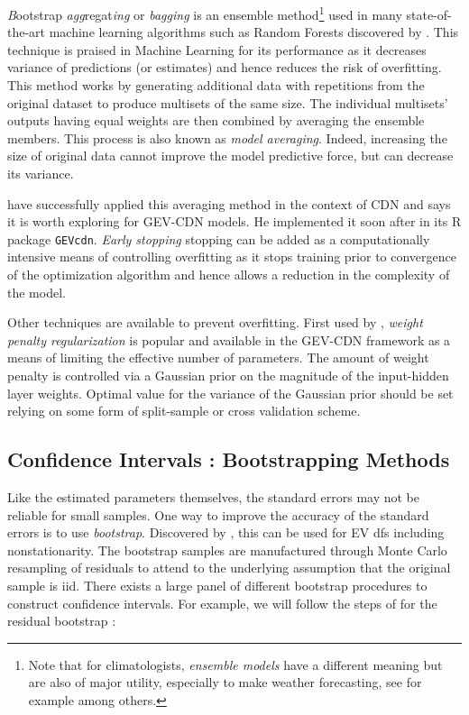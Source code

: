 \emph{B}ootstrap \emph{agg}regat\emph{ing} or \emph{bagging} is an ensemble method\footnote{Note that for climatologists, \emph{ensemble models} have a different meaning but are also of major utility, especially to make weather forecasting, see for example \citet{suh_development_2012} among others.} used in many state-of-the-art machine learning algorithms such as Random Forests discovered by \citet{Breiman_2001}. This technique is praised in Machine Learning for its performance as it decreases variance of predictions (or estimates) and hence reduces the risk of overfitting. This method works by generating additional data with repetitions from the original dataset to produce multisets of the same size.
The  individual  multisets’  outputs  having equal  weights  are  then  combined  by  averaging the ensemble members. This process is also known as \emph{model averaging}.
Indeed, increasing the size of original data cannot improve the model predictive force, but can decrease its variance.

 
\citet{Carney_2005} have successfully applied this averaging method in the context of CDN and \citet{cannon_flexible_2010} says it is worth exploring for GEV-CDN models. He implemented it soon after in its R package \texttt{GEVcdn}. \emph{Early stopping} stopping can be added as a computationally intensive means of controlling overfitting as it stops training prior to convergence of the optimization algorithm and hence allows a reduction in the complexity of the model.

Other techniques are available to prevent overfitting. First used by \citet{mackay92b}, \emph{weight penalty regularization} is popular and available in the GEV-CDN framework as a means of limiting the effective number of parameters. The amount of weight penalty is
controlled via a Gaussian prior on the magnitude of the input-hidden layer weights. Optimal value for the
variance of the Gaussian prior should be set relying on some form of split-sample or cross validation scheme.



\subsection{Confidence Intervals : Bootstrapping Methods}\label{sec:nnboot}

Like the estimated parameters themselves, the standard errors may not be reliable for small samples. One way to improve the accuracy of the standard errors is to use \emph{bootstrap}. Discovered by \citet{efron1979}, this can be used for EV dfs including nonstationarity. The bootstrap samples are manufactured through
Monte Carlo resampling of residuals to attend to the underlying assumption  that the original sample is iid.
There exists a large panel of different bootstrap procedures to construct confidence intervals.  For example, we will follow the steps of \citet{2006JHyd..329..534K} for the residual bootstrap : 
 
